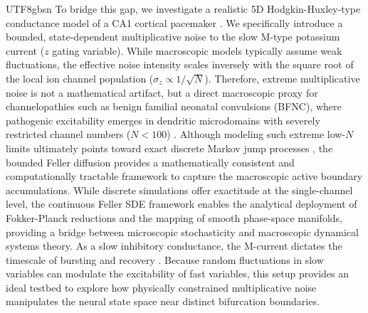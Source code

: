 ﻿\documentclass[reprint, amsmath, amssymb, aps, pre]{revtex4-2}
\begin{document}
\begin{CJK*}{UTF8}{gbsn}
To bridge this gap, we investigate a realistic 5D Hodgkin-Huxley-type conductance model of a CA1 cortical pacemaker \cite{golomb2006contribution}. We specifically introduce a bounded, state-dependent multiplicative noise to the slow M-type potassium current ($z$ gating variable). While macroscopic models typically assume weak fluctuations, the effective noise intensity scales inversely with the square root of the local ion channel population ($\sigma_z \propto 1/\sqrt{N}$). Therefore, extreme multiplicative noise is not a mathematical artifact, but a direct macroscopic proxy for channelopathies such as benign familial neonatal convulsions (BFNC), where pathogenic excitability emerges in dendritic microdomains with severely restricted channel numbers ($N < 100$) \cite{mittal2022heterogeneous}. Although modeling such extreme low-$N$ limits ultimately points toward exact discrete Markov jump processes \cite{fox1994emergent, gillespie1977exact}, the bounded Feller diffusion provides a mathematically consistent and computationally tractable framework to capture the macroscopic active boundary accumulations. While discrete simulations offer exactitude at the single-channel level, the continuous Feller SDE framework enables the analytical deployment of Fokker-Planck reductions and the mapping of smooth phase-space manifolds, providing a bridge between microscopic stochasticity and macroscopic dynamical systems theory. As a slow inhibitory conductance, the M-current dictates the timescale of bursting and recovery \cite{gutkin1998dynamics}. Because random fluctuations in slow variables can modulate the excitability of fast variables, this setup provides an ideal testbed to explore how physically constrained multiplicative noise manipulates the neural state space near distinct bifurcation boundaries.


\end{CJK*}
\end{document}
